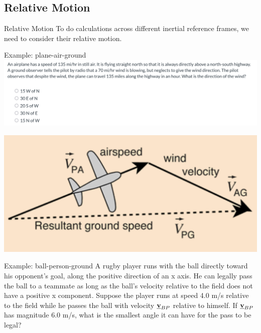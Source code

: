  \subsection{Relative Motion}

\begin{frame}{Relative Motion}
\small
To do calculations across different inertial reference frames, we need to consider their relative motion.\\
\vspace{10cm}
\end{frame}

\begin{frame}{Example: plane-air-ground}
\small
\includegraphics[scale=0.35]{plane-problem}

\includegraphics[scale=0.3]{plane}

\vspace{5cm}
\end{frame}

 
\begin{frame}{Example: ball-person-ground}
\scriptsize
A rugby player runs with the ball directly toward his opponent's goal, along the positive direction of an x axis. He can legally pass the ball to a teammate as long as the ball's velocity relative to the field does not have a positive x component. Suppose the player runs at speed 4.0 m/s relative to the field while he passes the ball with velocity $\underline{\mathbf{v}}_{BP}$ relative to himself. If $\underline{\mathbf{v}}_{BP}$ has magnitude 6.0 m/s, what is the smallest angle it can have for the pass to be legal?
\vspace{5cm}
\end{frame}


